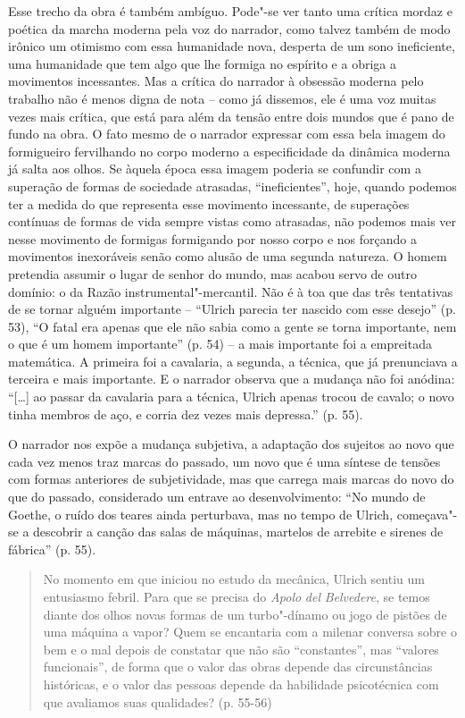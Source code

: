 Esse trecho da obra é também ambíguo. Pode"-se ver tanto uma crítica
mordaz e poética da marcha moderna pela voz do narrador, como talvez
também de modo irônico um otimismo com essa humanidade nova, desperta de
um sono ineficiente, uma humanidade que tem algo que lhe formiga no
espírito e a obriga a movimentos incessantes. Mas a crítica do narrador
à obsessão moderna pelo trabalho não é menos digna de nota -- como já
dissemos, ele é uma voz muitas vezes mais crítica, que está para além da
tensão entre dois mundos que é pano de fundo na obra. O fato mesmo de o
narrador expressar com essa bela imagem do formigueiro fervilhando no
corpo moderno a especificidade da dinâmica moderna já salta aos olhos.
Se àquela época essa imagem poderia se confundir com a superação de
formas de sociedade atrasadas, ``ineficientes'', hoje, quando podemos
ter a medida do que representa esse movimento incessante, de superações
contínuas de formas de vida sempre vistas como atrasadas, não podemos
mais ver nesse movimento de formigas formigando por nosso corpo e nos
forçando a movimentos inexoráveis senão como alusão de uma segunda
natureza. O homem pretendia assumir o lugar de senhor do mundo, mas
acabou servo de outro domínio: o da Razão instrumental"-mercantil. Não é
à toa que das três tentativas de se tornar alguém importante -- ``Ulrich
parecia ter nascido com esse desejo'' (p. 53), ``O fatal era apenas que
ele não sabia como a gente se torna importante, nem o que é um homem
importante'' (p. 54) -- a mais importante foi a empreitada matemática. A
primeira foi a cavalaria, a segunda, a técnica, que já prenunciava a
terceira e mais importante. E o narrador observa que a mudança não foi
anódina: ``[\ldots{}] ao passar da cavalaria para a técnica, Ulrich
apenas trocou de cavalo; o novo tinha membros de aço, e corria dez vezes
mais depressa.'' (p. 55).

O narrador nos expõe a mudança subjetiva, a adaptação dos sujeitos ao
novo que cada vez menos traz marcas do passado, um novo que é uma
síntese de tensões com formas anteriores de subjetividade, mas que
carrega mais marcas do novo do que do passado, considerado um entrave ao
desenvolvimento: ``No mundo de Goethe, o ruído dos teares ainda
perturbava, mas no tempo de Ulrich, começava"-se a descobrir a canção das
salas de máquinas, martelos de arrebite e sirenes de fábrica'' (p. 55).

\begin{quote}
No momento em que iniciou no estudo da mecânica, Ulrich sentiu um
entusiasmo febril. Para que se precisa do \emph{Apolo} \emph{del}
\emph{Belvedere}, se temos diante dos olhos novas formas de um
turbo"-dínamo ou jogo de pistões de uma máquina a vapor? Quem se
encantaria com a milenar conversa sobre o bem e o mal depois de
constatar que não são ``constantes'', mas ``valores funcionais'', de
forma que o valor das obras depende das circunstâncias históricas, e o
valor das pessoas depende da habilidade psicotécnica com que avaliamos
suas qualidades? (p. 55-56)
\end{quote}

